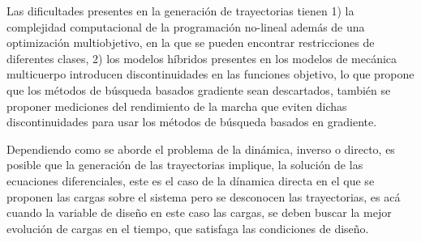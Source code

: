 {  Las dificultades presentes en la generaci\'on de trayectorias tienen 1) la complejidad computacional de la programaci\'on no-lineal adem\'as de una optimizaci\'on multiobjetivo, en la que se pueden encontrar restricciones de diferentes clases\cite{Mahmoodabadi2014}, 2) los modelos h\'ibridos presentes en los modelos de mec\'anica multicuerpo introducen discontinuidades en las funciones objetivo, lo que propone que los m\'etodos de b\'usqueda basados gradiente sean descartados\cite{Xiang2010}, tambi\'en se proponer mediciones del rendimiento de la marcha que eviten dichas discontinuidades para usar los m\'etodos de b\'usqueda basados en gradiente\cite{Xiang2010}.\par
  Dependiendo como se aborde el problema de la din\'amica, inverso o directo, es posible que la generaci\'on de las trayectorias implique, la soluci\'on de las ecuaciones diferenciales, este es el caso de la d\'inamica directa en el que se proponen las cargas sobre el sistema pero se desconocen las trayectorias, es ac\'a cuando la variable de dise\~no en este caso las cargas, se deben buscar la mejor evoluci\'on de cargas en el tiempo, que satisfaga las condiciones de dise\~no.\par
}

